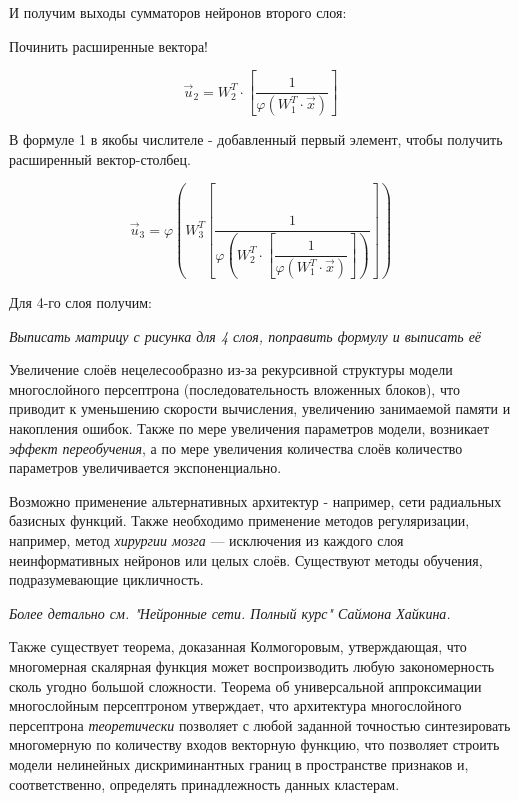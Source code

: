 \documentclass{article}
\numberwithin{equation}{subsection}
\begin{document}
И получим выходы сумматоров нейронов второго слоя:

\begin{myquote}
    Починить расширенные вектора!
\end{myquote}

\begin{equation}
    \vec{u}_2 = W_2^T \cdot [\dfrac{1}{\varphi(W_1^T \cdot \vec{x})}]
\end{equation}


В формуле 1 в якобы числителе - добавленный первый элемент, чтобы получить расширенный вектор-столбец.

\begin{equation}
    \vec{u}_3 = \varphi(W_3^T[\dfrac{1}{\varphi(W_2^T \cdot [\dfrac{1}{\varphi(W_1^T \cdot \vec{x})}])}])
\end{equation}

Для 4-го слоя получим:

\begin{myquote}
    \textit{Выписать матрицу с рисунка для 4 слоя, поправить формулу и выписать её}
\end{myquote}

Увеличение слоёв нецелесообразно из-за рекурсивной структуры модели многослойного 
персептрона (последовательность вложенных блоков), что приводит к уменьшению 
скорости вычисления, увеличению занимаемой памяти и накопления ошибок.
Также по мере увеличения параметров модели, возникает \textit{эффект переобучения}, 
а по мере увеличения количества слоёв количество параметров увеличивается экспоненциально.

Возможно применение альтернативных архитектур - например, сети радиальных базисных функций.
Также необходимо применение методов регуляризации, например, метод \textit{хирургии мозга} ---
исключения из каждого слоя неинформативных нейронов или целых слоёв.
Существуют методы обучения, подразумевающие цикличность.

\begin{myquote}
    \textit{Более детально см. "Нейронные сети. Полный курс" Саймона Хайкина.}
\end{myquote}

Также существует теорема, доказанная Колмогоровым, утверждающая, что многомерная 
скалярная функция может воспроизводить любую закономерность сколь угодно большой 
сложности. Теорема об универсальной аппроксимации многослойным персептроном 
утверждает, что архитектура многослойного персептрона \textit{теоретически} 
позволяет с любой заданной точностью синтезировать многомерную по количеству 
входов векторную функцию, что позволяет строить модели нелинейных 
дискриминантных границ в пространстве признаков и, соответственно, определять 
принадлежность данных кластерам. 
\end{document}
